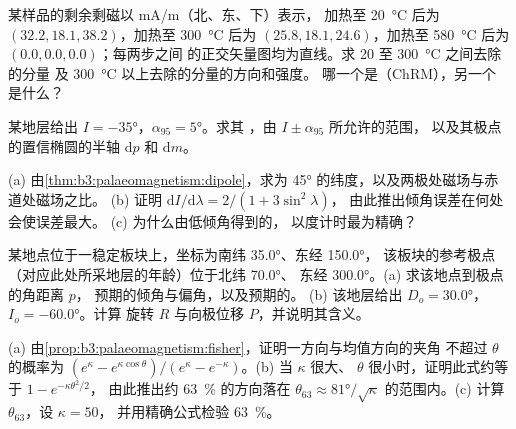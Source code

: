 \begin{exercise}[$\star\star$]\label{exo:b3:palaeomagnetism:8}
某样品的剩余剩磁以 \unit{mA/m}（北、东、下）表示，
加热至 \qty{20}{\celsius} 后为 $(32.2, 18.1, 38.2)$，加热至
\qty{300}{\celsius} 后为 $(25.8, 18.1, 24.6)$，加热至 \qty{580}{\celsius} 后为 $(0.0, 0.0, 0.0)$；每两步之间
的正交矢量图均为直线。求 20 至 \qty{300}{\celsius} 之间去除的分量
及 \qty{300}{\celsius} 以上去除的分量的方向和强度。
哪一个是（ChRM），另一个
是什么？
\end{exercise}

\begin{exercise}[$\star\star$]\label{exo:b3:palaeomagnetism:9}
某地层给出 $I = \ang{-35}$，$\alpha_{95} = \ang{5}$。求其
，由 $I \pm \alpha_{95}$ 所允许的范围，
以及其极点的置信椭圆的半轴 $\mathrm dp$ 和
$\mathrm dm$。
\end{exercise}

\begin{exercise}[$\star\star\star$]\label{exo:b3:palaeomagnetism:10}
(a) 由\cref{thm:b3:palaeomagnetism:dipole}，求为
\ang{45} 的纬度，以及两极处磁场与赤道处磁场之比。
(b) 证明 $\mathrm dI/\mathrm d\lambda = 2/(1 + 3\sin^2\lambda)$，
由此推出倾角误差在何处会使误差最大。
(c) 为什么由低倾角得到的，
以度计时最为精确？
\end{exercise}

\begin{exercise}[$\star\star\star$]\label{exo:b3:palaeomagnetism:11}
某地点位于一稳定板块上，坐标为南纬 \ang{35.0}、东经 \ang{150.0}，
该板块的参考极点（对应此处所采地层的年龄）位于北纬 \ang{70.0}、
东经 \ang{300.0}。(a) 求该地点到极点的角距离 $p$，
预期的倾角与偏角，以及预期的。
(b) 该地层给出 $D_o = \ang{30.0}$，$I_o = \ang{-60.0}$。计算
旋转 $R$ 与向极位移 $P$，并说明其含义。
\end{exercise}

\begin{exercise}[$\star\star\star$]\label{exo:b3:palaeomagnetism:12}
(a) 由\cref{prop:b3:palaeomagnetism:fisher}，证明一方向与均值方向的夹角
不超过 $\theta$ 的概率为 $(e^\kappa -
e^{\kappa\cos\theta})/(e^\kappa - e^{-\kappa})$。(b) 当 $\kappa$ 很大、
$\theta$ 很小时，证明此式约等于 $1 - e^{-\kappa\theta^2/2}$，
由此推出约 \qty{63}{\percent} 的方向落在 $\theta_{63} \approx
\ang{81}/\sqrt\kappa$ 的范围内。(c) 计算 $\theta_{63}$，设 $\kappa = 50$，
并用精确公式检验 \qty{63}{\percent}。
\end{exercise}

